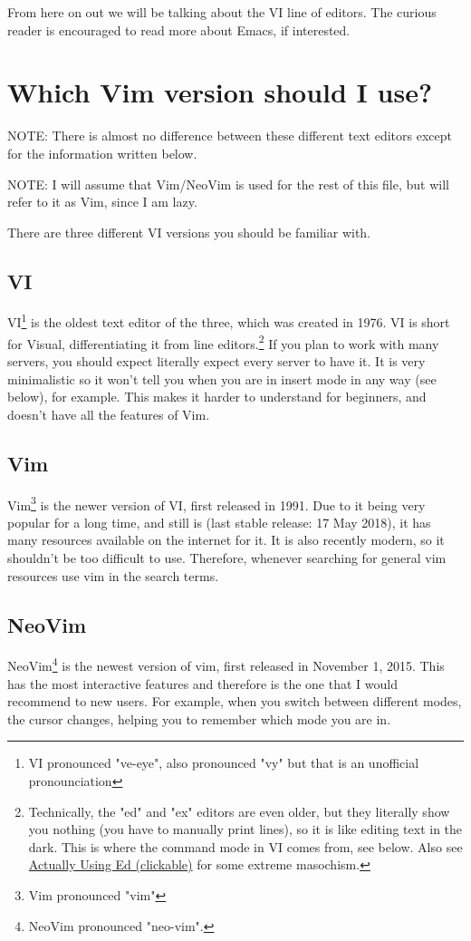 \documentclass[11pt]{article}
\begin{document}
From here on out we will be talking about the VI line of editors. The curious
reader is encouraged to read more about Emacs, if interested.
\section{Which Vim version should I use?}
\label{sec:org6f7e6a4}
NOTE: There is almost no difference between these different text editors except
for the information written below.

NOTE: I will assume that Vim/NeoVim is used for the rest of this file, but will
refer to it as Vim, since I am lazy.

There are three different VI versions you should be familiar with.
\subsection{VI}
\label{sec:orgc77e462}
VI\footnote{VI pronounced "ve-eye", also pronounced "vy" but that is an unofficial pronounciation} is the oldest text editor of the three, which was created in 1976. VI
is short for Visual, differentiating it from line editors.\footnote{Technically, the "ed" and "ex" editors are even older, but they literally
show you nothing (you have to manually print lines), so it is like editing text
in the dark. This is where the command mode in VI comes from, see below. Also see
\href{https://sanctum.geek.nz/arabesque/actually-using-ed/}{Actually Using Ed (clickable)} for some extreme masochism.} If you plan to
work with many servers, you should expect literally expect every server to have
it. It is very minimalistic so it won't tell you when you are in insert mode in
any way (see below), for example. This makes it harder to understand for
beginners, and doesn't have all the features of Vim.
\subsection{Vim}
\label{sec:org0080a3f}
Vim\footnote{Vim pronounced "vim"} is the newer version of VI, first released in 1991. Due to it being
very popular for a long time, and still is (last stable release: 17 May 2018),
it has many resources available on the internet for it. It is also recently
modern, so it shouldn't be too difficult to use. Therefore, whenever searching
for general vim resources use vim in the search terms.
\subsection{NeoVim}
\label{sec:orgdff50bc}
NeoVim\footnote{NeoVim pronounced "neo-vim".} is the newest version of vim, first released in November 1, 2015.
This has the most interactive features and therefore is the one that I would
recommend to new users. For example, when you switch between different modes,
the cursor changes, helping you to remember which mode you are in.
\end{document}
